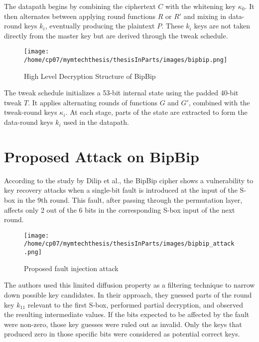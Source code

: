 The datapath begins by combining the ciphertext $C$ with the whitening key $\kappa_0$. It then alternates between applying round functions $R$ or $R'$ and mixing in data-round keys $k_i$, eventually producing the plaintext $P$. These $k_i$ keys are not taken directly from the master key but are derived through the tweak schedule.
\begin{figure}[h]
    \centering
    \texttt{[image: /home/cp07/mymtechthesis/thesisInParts/images/bipbip.png]}
    \caption{High Level Decryption Structure of BipBip}
    \label{fig:bipbip_decrypt_structure}
\end{figure}


The tweak schedule initializes a 53-bit internal state using the padded 40-bit tweak $T$. It applies alternating rounds of functions $G$ and $G'$, combined with the tweak-round keys $\kappa_i$. At each stage, parts of the state are extracted to form the data-round keys $k_i$ used in the datapath.

\section{Proposed Attack on BipBip}
According to the study by Dilip et al., the BipBip cipher shows a vulnerability to key recovery attacks when a single-bit fault is introduced at the input of the S-box in the 9th round. This fault, after passing through the permutation layer, affects only 2 out of the 6 bits in the corresponding S-box input of the next round. 
\begin{figure}[h]
    \centering
    \texttt{[image: /home/cp07/mymtechthesis/thesisInParts/images/bipbip\_attack.png]}
    \caption{Proposed fault injection attack}
    \label{fig:bipbip_attack}
\end{figure}
The authors used this limited diffusion property as a filtering technique to narrow down possible key candidates.
In their approach, they guessed parts of the round key $k_{11}$ relevant to the first S-box, performed partial decryption, and observed the resulting intermediate values. If the bits expected to be affected by the fault were non-zero, those key guesses were ruled out as invalid. Only the keys that produced zero in those specific bits were considered as potential correct keys.




